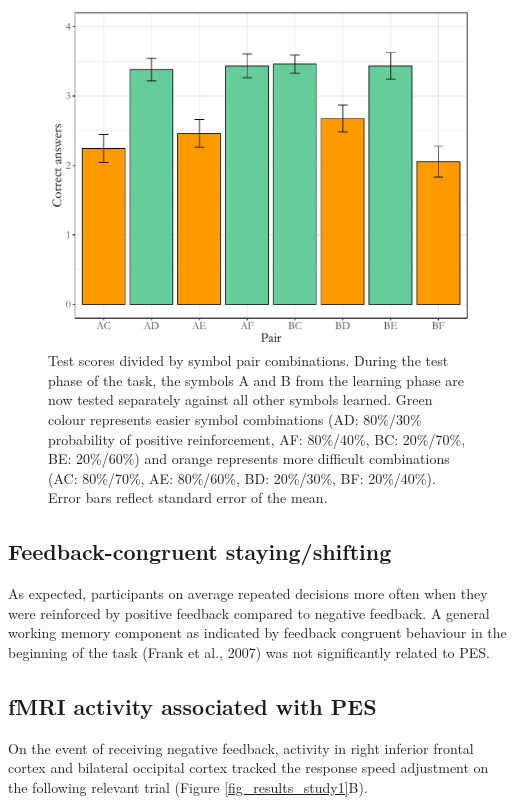\documentclass[12pt,openany]{book}
\theoremstyle{definition}
\theoremstyle{definition}
\theoremstyle{definition}
\theoremstyle{remark}
\begin{document}
\begin{figure}
  \centering
  \includegraphics[height=0.70000\textwidth]{./figures/test_scores_by_pair_se.pdf}
  \caption{Test scores divided by symbol pair combinations. During the test phase of the task, the symbols A and B from the learning phase are now tested separately against all other symbols learned. Green colour represents easier symbol combinations (AD: 80\%/30\% probability of positive reinforcement, AF: 80\%/40\%, BC: 20\%/70\%, BE: 20\%/60\%) and orange represents more difficult combinations (AC: 80\%/70\%, AE: 80\%/60\%, BD: 20\%/30\%, BF: 20\%/40\%). Error bars reflect standard error of the mean.\label{fig_testscores}}
\end{figure}

\subsection{Feedback-congruent
staying/shifting}\label{feedback-congruent-stayingshifting}

As expected, participants on average repeated decisions more often when
they were reinforced by positive feedback compared to negative feedback.
A general working memory component as indicated by feedback congruent
behaviour in the beginning of the task (Frank et al., 2007) was not
significantly related to PES.

\subsection{fMRI activity associated with
PES}\label{fmri-activity-associated-with-pes}

On the event of receiving negative feedback, activity in right inferior
frontal cortex and bilateral occipital cortex tracked the response speed
adjustment on the following relevant trial (Figure
\ref{fig_results_study1}B).
\end{document}
